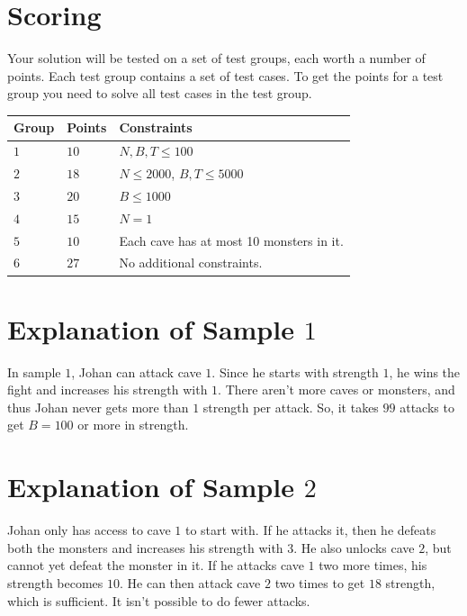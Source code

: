 \section*{Scoring}
Your solution will be tested on a set of test groups, each worth a number of points. Each test group contains
a set of test cases. To get the points for a test group you need to solve all test cases in the test group.

\noindent
\begin{tabular}{| l | l | p{12cm} |}
  \hline
  \textbf{Group} & \textbf{Points} & \textbf{Constraints} \\ \hline
  $1$    & $10$       & $N, B, T \leq 100$ \\ \hline
  $2$    & $18$       & $N \leq 2000$, $B, T \leq 5000$ \\ \hline
  $3$    & $20$       & $B \leq 1000$ \\ \hline
  $4$    & $15$       & $N=1$ \\ \hline
  $5$    & $10$       & Each cave has at most 10 monsters in it. \\ \hline
  $6$    & $27$       & No additional constraints. \\ \hline
\end{tabular}

\section*{Explanation of Sample $1$}
In sample $1$, Johan can attack cave $1$.
Since he starts with strength $1$, he wins the fight and increases his strength with $1$.
There aren't more caves or monsters, and thus Johan never gets more than $1$ strength per attack.
So, it takes $99$ attacks to get $B=100$ or more in strength.

\section*{Explanation of Sample $2$}
Johan only has access to cave $1$ to start with. 
If he attacks it, then he defeats both the monsters and increases his strength with $3$. 
He also unlocks cave $2$, but cannot yet defeat the monster in it.
If he attacks cave $1$ two more times, his strength becomes $10$. 
He can then attack cave $2$ two times to get $18$ strength, which is sufficient. 
It isn't possible to do fewer attacks.
